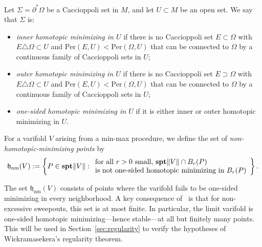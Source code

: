 \begin{definition}\label{def:homotopic-minimizer}
Let $\Sigma = \partial^*\Omega$ be a Caccioppoli set in $M$, and let $U \subset M$ be an open set. We say
that $\Sigma$ is:
\begin{itemize}
    \item \emph{inner homotopic minimizing in $U$} if there is no Caccioppoli set $E \subset \Omega$
    with $E \triangle \Omega \subset U$ and $\mathrm{Per}(E, U) < \mathrm{Per}(\Omega, U)$ that can be connected to
    $\Omega$ by a continuous family of Caccioppoli sets in $U$;
    \item \emph{outer homotopic minimizing in $U$} if there is no Caccioppoli set $E \supset \Omega$
    with $E \triangle \Omega \subset U$ and $\mathrm{Per}(E, U) < \mathrm{Per}(\Omega, U)$ that can be connected to
    $\Omega$ by a continuous family of Caccioppoli sets in $U$;
    \item \emph{one-sided homotopic minimizing in $U$} if it is either inner or outer homotopic
    minimizing in $U$.
\end{itemize}
\end{definition}

\begin{definition}\label{def:hnm}
For a varifold $V$ arising from a min-max procedure, we define the set of \emph{non-homotopic-minimizing
points} by
\[
    \mathfrak{h}_{\mathrm{nm}}(V) := \left\{P \in \mathbf{spt}\|V\| : \begin{array}{l}
        \text{for all $r > 0$ small, $\mathbf{spt}\|V\| \cap B_r(P)$} \\
        \text{is not one-sided homotopic minimizing in $B_r(P)$}
    \end{array}\right\}.
\]
\end{definition}

The set $\mathfrak{h}_{\mathrm{nm}}(V)$ consists of points where the varifold fails to be one-sided minimizing in every neighborhood. A key consequence of~\cite[Proposition~3.1]{CLS22} is that for non-excessive sweepouts, this set is at most finite. In particular, the limit varifold is one-sided homotopic minimizing---hence stable---at all but finitely many points. This will be used in Section~\ref{sec:regularity} to verify the hypotheses of Wickramasekera's regularity theorem.
